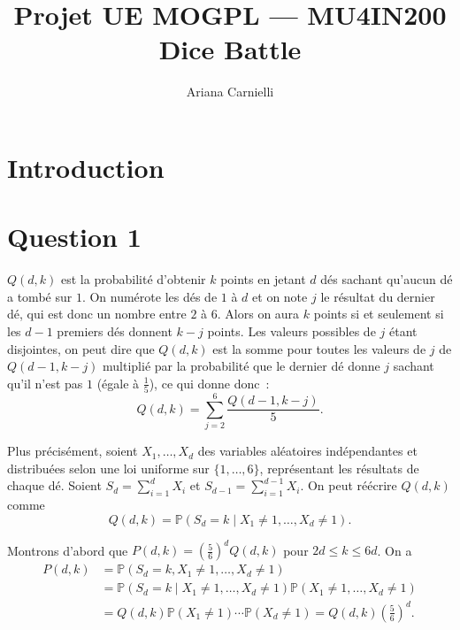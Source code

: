 \documentclass[a4paper,11pt]{amsart}
\theoremstyle{plain}
\begin{document}

\pagestyle{plain}

\title{Projet UE MOGPL --- MU4IN200 \\ Dice Battle}
\author{Ariana Carnielli}
\date{}

\maketitle



\section{Introduction}

\section{Question 1}

$Q(d,k)$ est la probabilité d'obtenir $k$ points en jetant $d$ dés sachant qu'aucun dé a tombé sur $1$. On numérote les dés de $1$ à $d$ et on note $j$ le résultat du dernier dé, qui est donc un nombre entre $2$ à $6$. Alors on aura $k$ points si et seulement si les $d-1$ premiers dés donnent $k-j$ points. Les valeurs possibles de $j$ étant disjointes, on peut dire que $Q(d, k)$ est la somme pour toutes les valeurs de $j$ de $Q(d-1, k-j)$ multiplié par la probabilité que le dernier dé donne $j$ sachant qu'il n'est pas $1$ (égale à $\frac{1}{5}$), ce qui donne donc~:
\begin{equation}
\label{RecurrenceQ}
Q(d, k) = \sum_{j=2}^6 \frac{Q(d-1, k-j)}{5}.
\end{equation}

Plus précisément, soient $X_1, \dotsc, X_d$ des variables aléatoires indépendantes et distribuées selon une loi uniforme sur $\{1, \dotsc, 6\}$, représentant les résultats de chaque dé. Soient $S_d = \sum_{i=1}^d X_i$ et $S_{d-1} = \sum_{i=1}^{d-1} X_i$. On peut réécrire $Q(d, k)$ comme
\[
Q(d, k) = \mathbb P(S_d = k \mid X_1 \neq 1, \dotsc, X_d \neq 1).
\]

Montrons d'abord que $P(d, k) = \left(\frac{5}{6}\right)^d Q(d, k)$ pour $2d \leq k \leq 6d$. On a
\begin{align*}
P(d, k) & = \mathbb P(S_d = k, X_1 \neq 1, \dotsc, X_d \neq 1) \\
& = \mathbb P(S_d = k \mid X_1 \neq 1, \dotsc, X_d \neq 1) \mathbb P(X_1 \neq 1, \dotsc, X_d \neq 1) \\
& = Q(d, k) \mathbb P(X_1 \neq 1) \dotsm \mathbb P(X_d \neq 1) = Q(d, k) \left(\tfrac{5}{6}\right)^d.
\end{align*}
\end{document}
